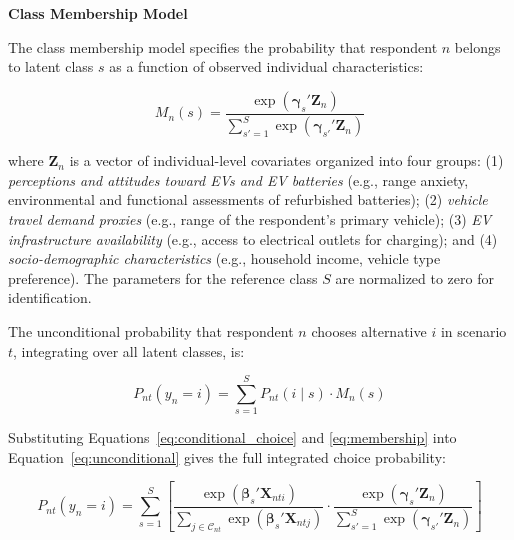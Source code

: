 \documentclass[a4paper,fleqn]{cas-sc}   %
\begin{document}
\vspace{\baselineskip}
\noindent \textbf{Class Membership Model} \par

The class membership model specifies the probability that respondent $n$ belongs to latent class $s$ as a function of observed individual characteristics:

\begin{equation}
    M_n(s) = \frac{\exp\!\left(\boldsymbol{\gamma}_s' \mathbf{Z}_n\right)}{\displaystyle\sum_{s'=1}^{S} \exp\!\left(\boldsymbol{\gamma}_{s'}' \mathbf{Z}_n\right)}
    \label{eq:membership}
\end{equation}

\noindent where $\mathbf{Z}_n$ is a vector of individual-level covariates organized into four groups: (1) \textit{perceptions and attitudes toward EVs and EV batteries} (e.g., range anxiety, environmental and functional assessments of refurbished batteries); (2) \textit{vehicle travel demand proxies} (e.g., range of the respondent's primary vehicle); (3) \textit{EV infrastructure availability} (e.g., access to electrical outlets for charging); and (4) \textit{socio-demographic characteristics} (e.g., household income, vehicle type preference). The parameters for the reference class $S$ are normalized to zero for identification.

The unconditional probability that respondent $n$ chooses alternative $i$ in scenario $t$, integrating over all latent classes, is:

\begin{equation}
    P_{nt}(y_n = i) = \sum_{s=1}^{S} P_{nt}(i \mid s) \cdot M_n(s)
    \label{eq:unconditional}
\end{equation}

Substituting Equations~\eqref{eq:conditional_choice} and \eqref{eq:membership} into Equation~\eqref{eq:unconditional} gives the full integrated choice probability:

\begin{equation}
    P_{nt}(y_n = i) = \sum_{s=1}^{S} \left[
        \frac{\exp\!\left(\boldsymbol{\beta}_s' \mathbf{X}_{nti}\right)}{\displaystyle\sum_{j \in \mathcal{C}_{nt}} \exp\!\left(\boldsymbol{\beta}_s' \mathbf{X}_{ntj}\right)}
        \cdot
        \frac{\exp\!\left(\boldsymbol{\gamma}_s' \mathbf{Z}_n\right)}{\displaystyle\sum_{s'=1}^{S} \exp\!\left(\boldsymbol{\gamma}_{s'}' \mathbf{Z}_n\right)}
    \right]
    \label{eq:full_prob}
\end{equation}
\end{document}
